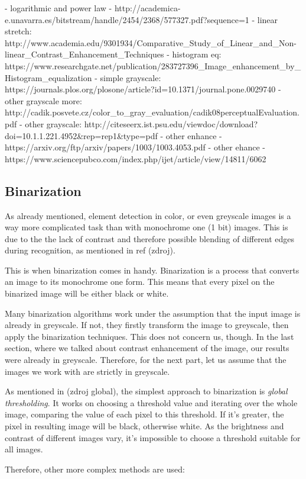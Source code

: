 - logarithmic and power law - http://academica-e.unavarra.es/bitstream/handle/2454/2368/577327.pdf?sequence=1
- linear stretch: http://www.academia.edu/9301934/Comparative_Study_of_Linear_and_Non-linear_Contrast_Enhancement_Techniques
- histogram eq: https://www.researchgate.net/publication/283727396_Image_enhancement_by_Histogram_equalization
- simple grayscale: https://journals.plos.org/plosone/article?id=10.1371/journal.pone.0029740
- other grayscale more: http://cadik.posvete.cz/color_to_gray_evaluation/cadik08perceptualEvaluation.pdf
- other grayscale: http://citeseerx.ist.psu.edu/viewdoc/download?doi=10.1.1.221.4952&rep=rep1&type=pdf
- other enhance - https://arxiv.org/ftp/arxiv/papers/1003/1003.4053.pdf
- other ehance - https://www.sciencepubco.com/index.php/ijet/article/view/14811/6062

\subsection{Binarization}

As already mentioned, element detection in color, or even greyscale images is a way more complicated task than with monochrome one (1 bit) images. This is due to the the lack of contrast and therefore possible blending of different edges during recognition, as mentioned in ref (zdroj).

This is when binarization comes in handy. Binarization is a process that converts an image to its monochrome one form. This means that every pixel on the binarized image will be either black or white.

Many binarization algorithms work under the assumption that the input image is already in greyscale. If not, they firstly transform the image to greyscale, then apply the binarization techniques. This does not concern us, though. In the last section, where we talked about contrast enhancement of the image, our results were already in greyscale. Therefore, for the next part, let us assume that the images we work with are strictly in greyscale.

As mentioned in (zdroj global), the simplest approach to binarization is \emph{global thresholding}. It works on choosing a threshold value and iterating over the whole image, comparing the value of each pixel to this threshold. If it's greater, the pixel in resulting image will be black, otherwise white. As the brightness and contrast of different images vary, it's impossible to choose a threshold suitable for all images.

Therefore, other more complex methods are used:

